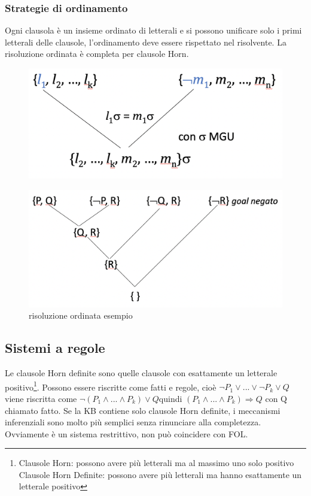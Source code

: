 \documentclass{article}
\begin{document}
\subsubsection{Strategie di ordinamento}
Ogni clausola è un insieme ordinato di letterali e si possono unificare solo i primi letterali delle clausole, l’ordinamento deve essere rispettato nel risolvente. La risoluzione ordinata è completa per clausole Horn.
\begin{figure}[H]
\centering
\includegraphics[scale=0.4]{Images/risoluzioneordinata.png}
\end{figure}
\begin{figure}[H]
\centering
\includegraphics[scale=0.4]{Images/risoluzioneordinataesempio.png}
\caption{risoluzione ordinata esempio}
\end{figure}

\subsection{Sistemi a regole}
Le clausole Horn definite sono quelle clausole con esattamente un letterale positivo\footnote{Clausole Horn: possono avere più letterali ma al massimo uno solo positivo \newline Clausole Horn Definite: possono avere più letterali ma hanno esattamente un letterale positivo}. Possono essere riscritte come fatti e regole, cioè \newline
$\neg P_1 \lor ... \lor \neg P_k \lor Q$ \quad viene riscritta come \newline
$\neg (P_1 \land ... \land P_k) \lor Q$\quad quindi \newline
$(P_1 \land ... \land P_k) \Rightarrow Q$ con Q chiamato fatto. \newline
Se la KB contiene solo clausole Horn definite, i meccanismi inferenziali sono molto più semplici senza rinunciare alla completezza. Ovviamente è un sistema restrittivo, non può coincidere con FOL.
\end{document}
